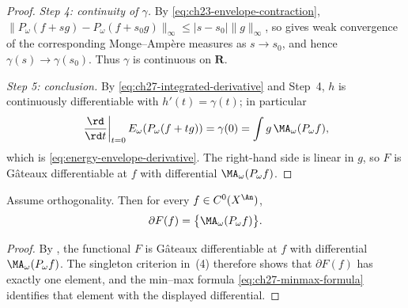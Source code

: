 \begin{proof}
\emph{Step 4: continuity of $\gamma$.}
By \eqref{eq:ch23-envelope-contraction},
$\lVert P_\omega(f+sg)-P_\omega(f+s_0g)\rVert_\infty
\leq|s-s_0|\lVert g\rVert_\infty$, so
 gives weak convergence of the corresponding
Monge--Amp\`ere measures as $s\to s_0$, and hence
$\gamma(s)\to\gamma(s_0)$.  Thus $\gamma$ is continuous on
$\mathbf R$.

\emph{Step 5: conclusion.}
By \eqref{eq:ch27-integrated-derivative} and Step~4, $h$ is continuously
differentiable with $h'(t)=\gamma(t)$; in particular
\[
 \left.\frac{\rd}{\rd t}\right|_{t=0}E_\omega(P_\omega(f+tg))
 =\gamma(0)=\int g\,\MA_\omega(P_\omega f),
\]
which is \eqref{eq:energy-envelope-derivative}.  The right-hand side is
linear in $g$, so $F$ is G\^ateaux differentiable at $f$ with
differential $\MA_\omega(P_\omega f)$.
\end{proof}

\begin{corollary}
\label{cor:ch27-singleton}
Assume orthogonality.  Then for every $f\in C^0(X^{\An})$,
\[
 \partial F(f)=\bigl\{\MA_\omega(P_\omega f)\bigr\}.
\]
\end{corollary}

\begin{proof}
By , the functional $F$ is
G\^ateaux differentiable at $f$ with differential
$\MA_\omega(P_\omega f)$.  The singleton criterion in
\,(4) therefore shows that
$\partial F(f)$ has exactly one element, and the min--max formula
\eqref{eq:ch27-minmax-formula} identifies that element with the displayed
differential.
\end{proof}

